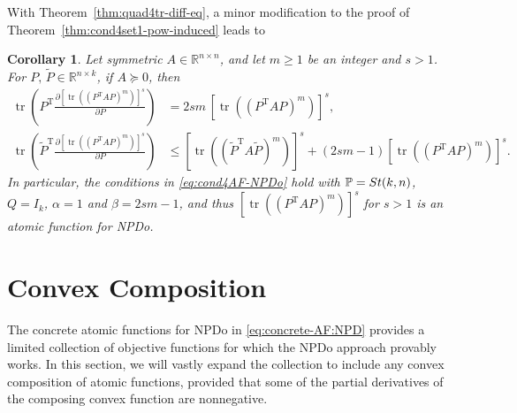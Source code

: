 \documentclass[11pt]{article}
\def\bbP{\mathbb{P}}
\def\bbR{\mathbb{R}}
\def\wtd{\widetilde}
\newcommand\STM[2]{{\rm St}(#1,#2)}
\DeclareMathOperator{\tr}{tr}
\DeclareMathOperator{\T}{T}
\newtheorem{corollary}{Corollary}[section]
\theoremstyle{definition}
\numberwithin{equation}{section}
\begin{document}


With Theorem~\ref{thm:quad4tr-diff-eq}, a minor modification to the proof of Theorem~\ref{thm:cond4set1-pow-induced}
leads to

\begin{corollary}\label{cor:pow(quad)4tr-diff-eq}
Let symmetric $A\in\bbR^{n\times n}$, and let $m\ge 1$ be an integer and $s>1$.
For $P,\,\wtd P\in\bbR^{n\times k}$,
if $A\succeq 0$, then
\begin{subequations}\label{eq:pow(quad)4tr-diff-eq}
\begin{align}
\tr\left(P^{\T}\frac{\partial [\tr((P^{\T}AP)^m)]^s}{\partial P}\right)
    &=2sm\, [\tr((P^{\T}AP)^m)]^s, \label{eq:quad-pow4trpow-diff-eq} \\
\tr\left(\wtd P^{\T}\frac{\partial [\tr((P^{\T}AP)^m)]^s}{\partial P}\right)
             &\le [\tr((\wtd P^{\T}A\wtd P)^m)]^s+(2sm-1)[\tr((P^{\T}AP)^m)]^s.
                      \label{eq:quad-pow-regularity4pow-diff-eq}
\end{align}
\end{subequations}
In particular, the conditions in \eqref{eq:cond4AF-NPDo} hold with $\bbP=\STM{k}{n}$, $Q=I_k$,
$\alpha=1$ and $\beta=2sm-1$,
and thus $[\tr((P^{\T}AP)^m)]^s$  for $s>1$ is an atomic function for NPDo.
\end{corollary}




\section{Convex Composition}\label{sec:CVX-comp:NPDo}
The concrete atomic functions for NPDo in \eqref{eq:concrete-AF:NPD} provides a limited collection of objective functions
for which the NPDo approach provably works. In this section, we will vastly expand the collection to include
any convex composition of atomic functions, provided that some of the partial derivatives
of the composing convex function are  nonnegative.
\end{document}
